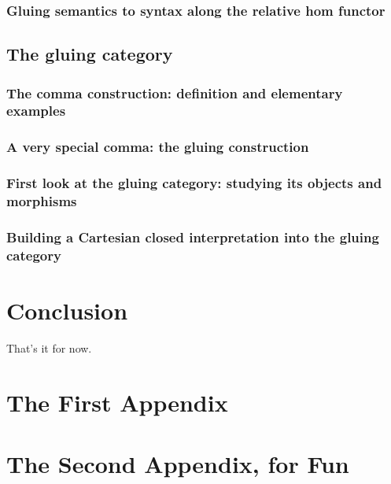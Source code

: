 \documentclass[12pt,twoside]{reedthesis}
\theoremstyle{definition}
\theoremstyle{remark}
\theoremstyle{plain}
\begin{document}
\subsection{Gluing semantics to syntax along the relative hom functor}
\section{The gluing category}

\subsection{The comma construction: definition and elementary examples}
\subsection{A very special comma: the gluing construction}
\subsection{First look at the gluing category: studying its objects and morphisms}
\subsection{Building a Cartesian closed interpretation into the gluing category}

\chapter*{Conclusion}
\setcounter{chapter}{4}
\setcounter{section}{0}

That's it for now.

\appendix
\chapter{The First Appendix}
\chapter{The Second Appendix, for Fun}



\backmatter%
\end{document}
